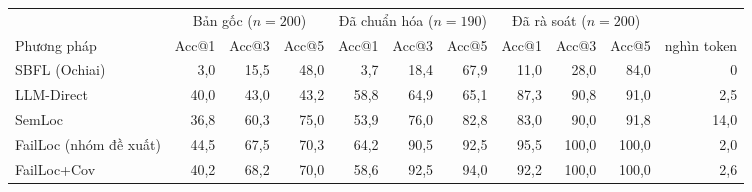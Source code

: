\begin{tabular}{lrrrrrrrrrr}
\toprule
 & \multicolumn{3}{c}{Bản gốc ($n=200$)} & \multicolumn{3}{c}{Đã chuẩn hóa ($n=190$)} & \multicolumn{3}{c}{Đã rà soát ($n=200$)} & \\
\cmidrule(lr){2-4}\cmidrule(lr){5-7}\cmidrule(lr){8-10}
Phương pháp & Acc@1 & Acc@3 & Acc@5 & Acc@1 & Acc@3 & Acc@5 & Acc@1 & Acc@3 & Acc@5 & nghìn token \\
\midrule
SBFL (Ochiai) & 3,0 & 15,5 & 48,0 & 3,7 & 18,4 & 67,9 & 11,0 & 28,0 & 84,0 & 0 \\
LLM-Direct & 40,0 & 43,0 & 43,2 & 58,8 & 64,9 & 65,1 & 87,3 & 90,8 & 91,0 & 2,5 \\
SemLoc & 36,8 & 60,3 & 75,0 & 53,9 & 76,0 & 82,8 & 83,0 & 90,0 & 91,8 & 14,0 \\
FailLoc (nhóm đề xuất) & 44,5 & 67,5 & 70,3 & 64,2 & 90,5 & 92,5 & 95,5 & 100,0 & 100,0 & 2,0 \\
FailLoc+Cov & 40,2 & 68,2 & 70,0 & 58,6 & 92,5 & 94,0 & 92,2 & 100,0 & 100,0 & 2,6 \\
\bottomrule
\end{tabular}
